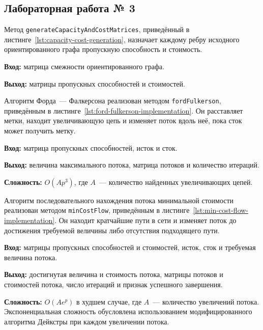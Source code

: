 \subsection{Лабораторная работа № 3}

Метод \texttt{generateCapacityAndCostMatrices}, приведённый в листинге~\ref{lst:capacity-cost-generation}, назначает каждому ребру исходного ориентированного графа пропускную способность и стоимость.

\textbf{Вход:} матрица смежности ориентированного графа.

\textbf{Выход:} матрицы пропускных способностей и стоимостей.


Алгоритм Форда~--- Фалкерсона реализован методом \texttt{fordFulkerson}, приведённым в листинге~\ref{lst:ford-fulkerson-implementation}. Он расставляет метки, находит увеличивающую цепь и изменяет поток вдоль неё, пока сток может получить метку.

\textbf{Вход:} матрица пропускных способностей, исток и сток.

\textbf{Выход:} величина максимального потока, матрица потоков и количество итераций.

\textbf{Сложность:} $O(Ap^3)$, где $A$~--- количество найденных увеличивающих цепей.


Алгоритм последовательного нахождения потока минимальной стоимости реализован методом \texttt{minCostFlow}, приведённым в листинге~\ref{lst:min-cost-flow-implementation}. Он находит кратчайшие пути в сети и изменяет поток до достижения требуемой величины либо отсутствия подходящего пути.

\textbf{Вход:} матрицы пропускных способностей и стоимостей, исток, сток и требуемая величина потока.

\textbf{Выход:} достигнутая величина и стоимость потока, матрицы потоков и стоимостей потока, число итераций и признак успешного завершения.

\textbf{Сложность:} $O(Ae^p)$ в худшем случае, где $A$~--- количество увеличений потока. Экспоненциальная сложность обусловлена использованием модифицированного алгоритма Дейкстры при каждом увеличении потока.

